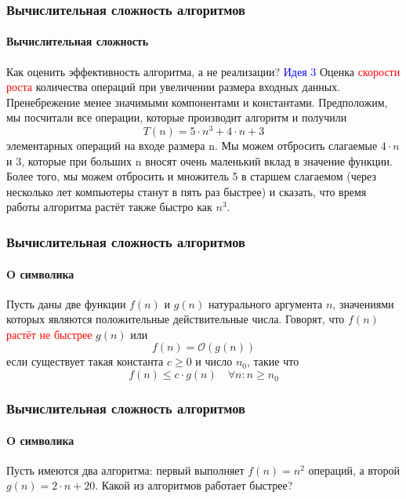 \documentclass[aspectratio=169]{beamer}
\begin{document}
\begin{frame}
\frametitle{Вычислительная сложность алгоритмов}
\framesubtitle{Вычислительная сложность}
\justifying
\small
Как оценить эффективность алгоритма, а не реализации?\newline\newline
\textcolor{blue}{Идея 3}
Оценка \textcolor{red}{скорости роста} количества операций при увеличении размера входных данных. Пренебрежение менее значимыми компонентами и константами.\newline\newline
Предположим, мы посчитали все операции, которые производит алгоритм и получили \newline $$T(n) = 5\cdot n^3 + 4\cdot n + 3$$ элементарных операций на входе размера n. \newline Мы можем отбросить слагаемые $4\cdot n$ и $3$, которые при больших n вносят очень маленький вклад в значение функции. \newline Более того, мы можем отбросить и множитель 5 в старшем слагаемом (через несколько лет компьютеры станут в пять раз быстрее) и сказать, что время работы алгоритма растёт также быстро как $n^3$.

\end{frame}

\begin{frame}
\frametitle{Вычислительная сложность алгоритмов}
\framesubtitle{O символика}
\justifying
Пусть даны две функции $f(n)$ и $g(n)$ натурального аргумента $n$, значениями которых являются положительные действительные числа.\newline\newline
Говорят, что $f(n)$ \textcolor{red}{растёт не быстрее} $g(n)$ или $$f(n) = \mathcal{O}(g(n))$$если существует такая константа $c \geq 0$ и число $n_0$, такие что $$f(n) \leq c \cdot g(n) \quad \forall n : n \geq n_0 $$

\end{frame}	

\begin{frame}
\frametitle{Вычислительная сложность алгоритмов}
\framesubtitle{O символика}
\justifying
Пусть имеются два алгоритма: первый выполняет $f(n) = n^2$ операций, а второй $g(n) = 2\cdot n + 20$. Какой из алгоритмов работает быстрее?

\end{frame}
\end{document}
